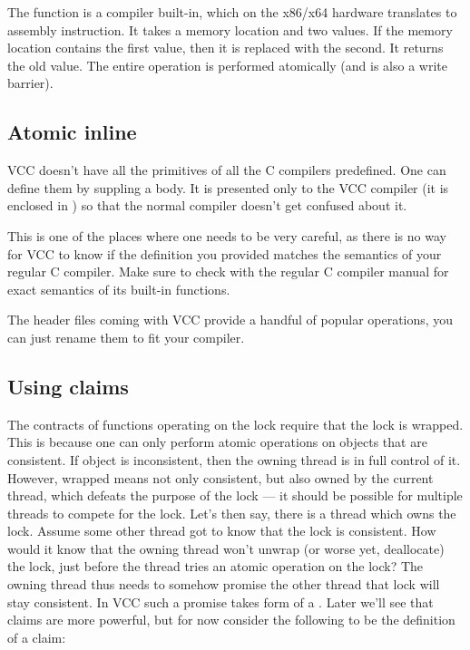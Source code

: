 
\noindent
The  function is a compiler built-in,
which on the x86/x64 hardware translates to  assembly instruction.
It takes a memory location and two values.
If the memory location contains the first value, then it is replaced with the second.
It returns the old value.
The entire operation is performed atomically (and is also a write barrier).

\subsection{Atomic inline}

VCC doesn't have all the primitives of all the C compilers predefined.
One can define them by suppling a body.
It is presented only to the VCC compiler (it is enclosed in
) so that the normal compiler doesn't get confused
about it.


\noindent
This is one of the places where one needs to be very careful,
as there is no way for VCC to know if the definition you provided matches
the semantics of your regular C compiler.
Make sure to check with the regular C compiler manual for exact semantics
of its built-in functions.

The header files coming with VCC provide a handful of popular operations,
you can just rename them to fit your compiler.

\subsection{Using claims}

The contracts of functions operating on the lock require that the lock
is wrapped.
This is because one can only perform atomic operations on objects
that are consistent. 
If object is inconsistent, then the owning thread is in full control of it.
However, wrapped means not only consistent, but also owned by the current thread,
which defeats the purpose of the lock --- it should be possible
for multiple threads to compete for the lock.
Let's then say, there is a thread which owns the lock.
Assume some other thread got to know that the lock is consistent.
How would it know that the owning thread won't unwrap (or worse yet, deallocate) the lock, just
before the thread tries an atomic operation on the lock?
The owning thread thus needs to somehow promise the other thread
that lock will stay consistent.
In VCC such a promise takes form of a .
Later we'll see that claims are more powerful, but for
now consider the following to be the definition of a claim:

